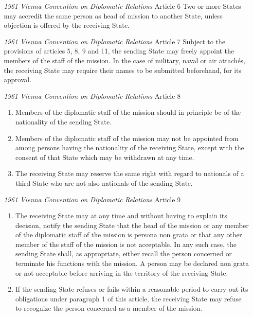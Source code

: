 \begin{conventiondetails}{\textit{1961 Vienna Convention on Diplomatic Relations} Article 6}
    \flushleft
    Two or more States may accredit the same person as head of mission to another State, unless objection is offered by the receiving State.
\end{conventiondetails}

\begin{conventiondetails}{\textit{1961 Vienna Convention on Diplomatic Relations} Article 7}
    \flushleft
    Subject to the provisions of articles 5, 8, 9 and 11, the sending State may freely appoint the members of the staff of the mission. In the case of military, naval or air attachés, the receiving State may require their names to be submitted beforehand, for its approval.
\end{conventiondetails}

\begin{conventiondetails}{\textit{1961 Vienna Convention on Diplomatic Relations} Article 8}
    \flushleft
    \begin{enumerate}
        \item Members of the diplomatic staff of the mission should in principle be of the nationality of the sending State.
        \item Members of the diplomatic staff of the mission may not be appointed from among persons having the nationality of the receiving State, except with the consent of that State which may be withdrawn at any time.
        \item The receiving State may reserve the same right with regard to nationals of a third State who are not also nationals of the sending State.
    \end{enumerate}
\end{conventiondetails}

\begin{conventiondetails}{\textit{1961 Vienna Convention on Diplomatic Relations} Article 9}
    \flushleft
    \begin{enumerate}
        \item The receiving State may at any time and without having to explain its decision, notify the sending State that the head of the mission or any member of the diplomatic staff of the mission is persona non grata or that any other member of the staff of the mission is not acceptable. In any such case, the sending State shall, as appropriate, either recall the person concerned or terminate his functions with the mission. A person may be declared non grata or not acceptable before arriving in the territory of the receiving State.
        \item If the sending State refuses or fails within a reasonable period to carry out its obligations under paragraph 1 of this article, the receiving State may refuse to recognize the person concerned as a member of the mission.
    \end{enumerate}
\end{conventiondetails}

